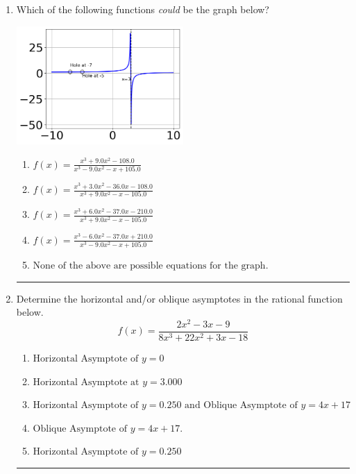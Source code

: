 \documentclass[14pt]{extbook}
\newcommand{\litem}[1]{\item#1\hspace*{-1cm}\rule{\textwidth}{0.4pt}}
\begin{document}
\begin{enumerate}
{\begin{enumerate}[label=\Alph*.]
\end{enumerate} }
\litem{
Which of the following functions \textit{could} be the graph below?
\begin{center}
    \includegraphics[width=0.5\textwidth]{../Figures/identifyGraphOfRationalFunctionCopyA.png}
\end{center}
\begin{enumerate}[label=\Alph*.]
\item \( f(x)=\frac{x^{3} +9.0 x^{2} -108.0}{x^{3} -9.0 x^{2} -x + 105.0} \)
\item \( f(x)=\frac{x^{3} +3.0 x^{2} -36.0 x -108.0}{x^{3} +9.0 x^{2} -x -105.0} \)
\item \( f(x)=\frac{x^{3} +6.0 x^{2} -37.0 x -210.0}{x^{3} +9.0 x^{2} -x -105.0} \)
\item \( f(x)=\frac{x^{3} -6.0 x^{2} -37.0 x + 210.0}{x^{3} -9.0 x^{2} -x + 105.0} \)
\item \( \text{None of the above are possible equations for the graph.} \)

\end{enumerate} }
\litem{
Determine the horizontal and/or oblique asymptotes in the rational function below.\[ f(x) = \frac{2x^{2} -3 x -9}{8x^{3} +22 x^{2} +3 x -18} \]\begin{enumerate}[label=\Alph*.]
\item \( \text{Horizontal Asymptote of } y = 0 \)
\item \( \text{Horizontal Asymptote at } y = 3.000 \)
\item \( \text{Horizontal Asymptote of } y = 0.250 \text{ and Oblique Asymptote of } y = 4x + 17 \)
\item \( \text{Oblique Asymptote of } y = 4x + 17. \)
\item \( \text{Horizontal Asymptote of } y = 0.250  \)


\end{enumerate}}
\end{enumerate}
\end{document}
